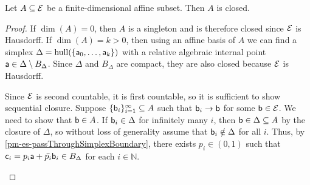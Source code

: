 \begin{mathSection}
	\begin{prop}\label{pm-es-affineSetsClosed}
		Let $A\subseteq\Ens$ be a finite-dimensional affine subset. Then $A$ is closed.
	\end{prop}
	
	\begin{proof}
		If $\dim(A)=0$, then $A$ is a singleton and is therefore closed since $\Ens$ is Hausdorff. If $\dim(A) = k > 0$, then using an affine basis of $A$ we can find a simplex $\Delta = \hull(\{\ens[a]_0,\ldots,\ens[a]_k\})$ with a relative algebraic internal point $\ens[a] \in \Delta \setminus B_\Delta$. Since $\Delta$ and $B_\Delta$ are compact, they are also closed because $\Ens$ is Hausdorff.
		
		Since $\Ens$ is second countable, it is first countable, so it is sufficient to show sequential closure. Suppose $\{\ens[b]_i\}_{i=1}^\infty \subseteq A$ such that $\ens[b]_i \to \ens[b]$ for some $\ens[b] \in \Ens$. We need to show that $\ens[b] \in A$. If $\ens[b]_i \in \Delta$ for infinitely many $i$, then $\ens[b] \in \Delta \subseteq A$ by the closure of $\Delta$, so without loss of generality assume that $\ens[b]_i \notin \Delta$ for all $i$. Thus, by \ref{pm-es-passThroughSimplexBoundary}, there exists $p_i \in (0,1)$ such that $\ens[c]_i = p_i\ens[a] + \bar{p_i}\ens[b]_i \in B_\Delta$ for each $i \in \mathbb{N}$.
		
		\begin{figure}[H]
			\centering
\end{figure}
\end{proof}
\end{mathSection}
